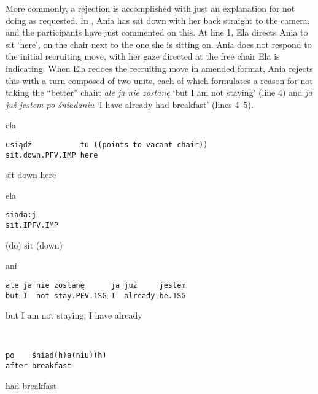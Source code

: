 \documentclass[output=paper]{langsci/langscibook}
\begin{document}
More commonly, a rejection is accomplished with just an explanation for not doing as requested.  In , Ania has sat down with her back straight to the camera, and the participants have just commented on this.  At line 1, Ela directs Ania to sit ‘here’, on the chair next to the one she is sitting on.  Ania does not respond to the initial recruiting move, with her gaze directed at the free chair Ela is indicating.  When Ela redoes the recruiting move in amended format, Ania rejects this with a turn composed of two units, each of which formulates a reason for not taking the “better” chair: \textit{ale ja nie zostanę} `but I am not staying' (line 4) and \textit{ja już jestem po śniadaniu} ‘I have already had breakfast’ (lines 4--5).

\vspace{-1mm}
%
\begin{mdframednoverticalspace}[style=firstfoc]
\begin{transbox}{1}{ela}
\begin{verbatim}
usiądź           tu ((points to vacant chair))
sit.down.PFV.IMP here
\end{verbatim}
sit down here
\end{transbox}
\end{mdframednoverticalspace}
%
%
\begin{mdframednoverticalspace}[style=firstfoc]
\begin{transbox}{3}{ela}
\begin{verbatim}
siada:j
sit.IPFV.IMP
\end{verbatim}
(do) sit (down)
\end{transbox}
\end{mdframednoverticalspace}
%
\begin{mdframednoverticalspace}[style=secondfoc]
\begin{transbox}{4}{ani}
\begin{verbatim}
ale ja nie zostanę      ja już     jestem
but I  not stay.PFV.1SG I  already be.1SG
\end{verbatim}
but I am not staying, I have already
\end{transbox}
\end{mdframednoverticalspace}
%
\begin{mdframednoverticalspace}[style=secondfoc]
\begin{transbox}{5}{~}
\begin{verbatim}
po    śniad(h)a(niu)(h)
after breakfast
\end{verbatim}
had breakfast
\end{transbox}
\end{mdframednoverticalspace}
\end{document}
